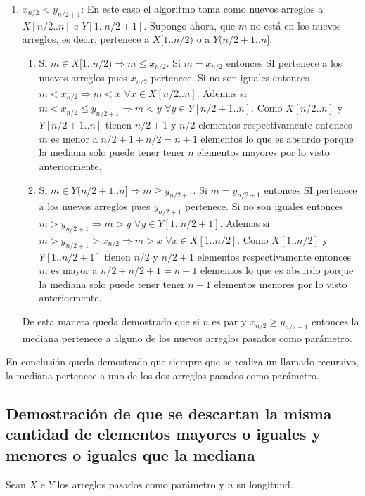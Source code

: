 \documentclass[a4paper,10pt] {article}
\begin{document}
\begin{enumerate}
\begin{enumerate}
\item $x_{n/2}<y_{n/2+1}$:
En este caso el algoritmo toma como nuevos arreglos a $X[n/2..n]$ e $Y[1..n/2+1]$. Supongo ahora, que $m$ no est\'a en los nuevos arreglos, es decir, pertenece a $X[1..n/2)$ o a $Y(n/2+1..n]$. 
\begin{enumerate}
\item
 Si $m \in X[1..n/2) \Longrightarrow m \leq x_{n/2}$. Si $m=x_{n/2}$ entonces SI pertenece a los nuevos arreglos pues $x_{n/2}$ pertenece. Si no son iguales entonces $m<x_{n/2} \Longrightarrow m<x \,\,\forall x \in X[n/2..n]$. Ademas si $m<x_{n/2}\leq y_{n/2+1} \Longrightarrow m<y \,\,\forall y \in Y[n/2+1..n]$. Como $X[n/2..n]$ y $Y[n/2+1..n]$ tienen $n/2+1$ y $n/2$ elementos respectivamente entonces $m$ es menor a $n/2+1+n/2=n+1$ elementos lo que es absurdo porque la mediana solo puede tener tener $n$ elementos mayores por lo visto anteriormente.
\item
  Si $m \in Y(n/2+1..n]\Longrightarrow m \geq y_{n/2+1}$. Si $m=y_{n/2+1}$ entonces SI pertenece a los nuevos arreglos pues $y_{n/2+1}$ pertenece. Si no son iguales entonces $m>y_{n/2+1} \Longrightarrow m>y \,\,\forall y \in Y[1..n/2+1]$. Ademas si $m>y_{n/2+1}> x_{n/2} \Longrightarrow m>x \,\,\forall x \in X[1..n/2]$. Como $X[1..n/2]$ y $Y[1..n/2+1]$ tienen $n/2$ y $n/2+1$ elementos respectivamente entonces $m$ es mayor a $n/2+n/2+1=n+1$ elementos lo que es absurdo porque la mediana solo puede tener tener $n-1$ elementos menores por lo visto anteriormente.
\end{enumerate}

De esta manera queda demostrado que si $n$ es par y $x_{n/2}\geq y_{n/2+1}$ entonces la mediana pertenece a alguno de los nuevos arreglos pasados como par\'ametro.

\end{enumerate}

\end{enumerate}

En conclusi\'on queda demostrado que siempre que se realiza un llamado recursivo, la mediana pertenece a uno de los dos arreglos pasados como par\'ametro.


\subsection*{Demostraci\'on de que se descartan la misma cantidad de elementos mayores o iguales y menores o iguales que la mediana}

Sean $X$ e $Y$ los arreglos pasados como par\'ametro y $n$ su longituud.
\end{document}

